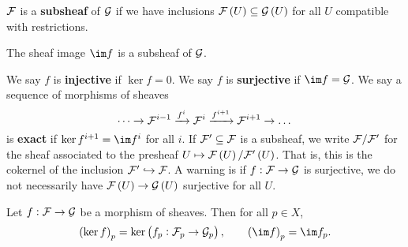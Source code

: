 $ \mathcal{F} $ is a \textbf{subsheaf} of $ \mathcal{G} $ if we have inclusions $ \FFF\br{U} \subseteq \GGG\br{U} $ for all $ U $ compatible with restrictions.

\begin{exercise*}
The sheaf image $ \im f $ is a subsheaf of $ \mathcal{G} $.
\end{exercise*}

We say $ f $ is \textbf{injective} if $ \ker f = 0 $. We say $ f $ is \textbf{surjective} if $ \im f = \GGG $. We say a sequence of morphisms of sheaves
$$ \dots \to \mathcal{F}^{i - 1} \xrightarrow{f^i} \mathcal{F}^i \xrightarrow{f^{i + 1}} \mathcal{F}^{i + 1} \to \dots $$
is \textbf{exact} if $ \ker f^{i + 1} = \im f^i $ for all $ i $. If $ \mathcal{F}' \subseteq \mathcal{F} $ is a subsheaf, we write $ \mathcal{F} / \mathcal{F}' $ for the sheaf associated to the presheaf $ U \mapsto \FFF\br{U} / \FFF'\br{U} $. That is, this is the cokernel of the inclusion $ \mathcal{F}' \hookrightarrow \mathcal{F} $. A warning is if $ f : \mathcal{F} \to \mathcal{G} $ is surjective, we do not necessarily have $ \FFF\br{U} \to \GGG\br{U} $ surjective for all $ U $.

\begin{lemma}
Let $ f : \mathcal{F} \to \mathcal{G} $ be a morphism of sheaves. Then for all $ p \in X $,
$$ \br{\ker f}_p = \ker \br{f_p : \FFF_p \to \GGG_p}, \qquad \br{\im f}_p = \im f_p. $$
\end{lemma}

